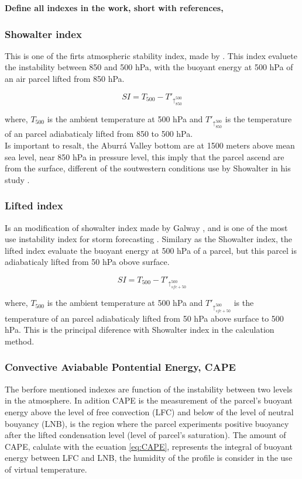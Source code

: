 \documentclass[	DIV=calc,%
							paper=a4,%
							fontsize=11pt,%
							twocolumn]{scrartcl}	 					%
\begin{document}
\textbf{Define all indexes in the work, short with references, }

\subsubsection{Showalter index}
This is one of the firts atmospheric stability index, made by \cite{showalter1953stability}. This index evaluete the instability between 850 and 500 hPa, with the buoyant energy at 500 hPa of an air parcel lifted from 850 hPa.


\begin{equation}
SI = T_{500} - T'_{\uparrow_{850}^{500} }
\label{eq:SI}
\end{equation}

where, $T_{500}$ is the ambient temperature at 500 hPa and $T'_{\uparrow_{850}^{500} }$ is the temperature of an parcel adiabaticaly lifted from 850 to 500 hPa.\\

Is important to resalt, the Aburrá Valley bottom are at 1500 meters above mean sea level, near 850 hPa in pressure level, this imply that the parcel ascend are from the surface, different of the soutwestern conditions use by Showalter in his study \citep{peppler1988review}.


\subsubsection{Lifted index}

Is an modification of showalter index made by Galway \cite{galway1956lifted}, and is one of the most use instability index for storm forecasting \cite{peppler1988review}. Similary as the Showalter index, the lifted index evaluate the buoyant energy at 500 hPa of a parcel, but this parcel is adiabaticaly lifted from 50 hPa obove surface. 

\begin{equation}
SI = T_{500} - T'_{\uparrow_{sfc +50}^{500} }
\label{eq:SI}
\end{equation}

where, $T_{500}$ is the ambient temperature at 500 hPa and $T'_{\uparrow_{sfc +50}^{500} }$ is the temperature of an parcel adiabaticaly lifted from 50 hPa above surface to 500 hPa. This is the principal diference with Showalter index in the calculation method.\\


\subsubsection{Convective Aviabable Pontential Energy, CAPE}
The berfore mentioned indexes are function of the instability between two levels in the atmosphere. In adition CAPE is the measurement of the parcel's buoyant energy above the level of free convection (LFC) and below of the level of neutral bouyancy (LNB), is the region where the parcel experiments positive buoyancy after the lifted condensation level (level of parcel's saturation). The amount of CAPE, calulate with the ecuation \ref{eq:CAPE}, represents the integral of buoyant energy between LFC and LNB, the humidity of the profile is consider in the use of virtual temperature. 
\end{document}

